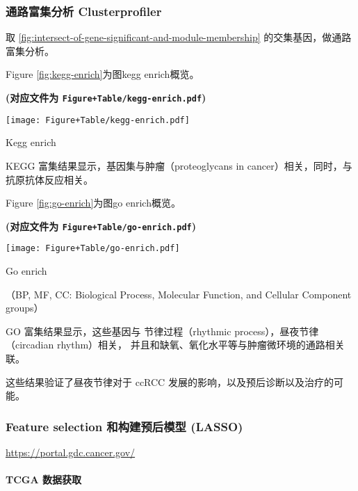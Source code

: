 \documentclass[
]{article}
\begin{document}
\hypertarget{ux901aux8defux5bccux96c6ux5206ux6790-clusterprofiler}{%
\subsubsection{通路富集分析 Clusterprofiler}\label{ux901aux8defux5bccux96c6ux5206ux6790-clusterprofiler}}

取 \ref{fig:intersect-of-gene-significant-and-module-membership} 的交集基因，做通路富集分析。

Figure \ref{fig:kegg-enrich}为图kegg enrich概览。

\textbf{(对应文件为 \texttt{Figure+Table/kegg-enrich.pdf})}

\def\@captype{figure}
\begin{center}
\texttt{[image: Figure+Table/kegg-enrich.pdf]}
\caption{Kegg enrich}\label{fig:kegg-enrich}
\end{center}

KEGG 富集结果显示，基因集与肿瘤（proteoglycans in cancer）相关，同时，与抗原抗体反应相关。

Figure \ref{fig:go-enrich}为图go enrich概览。

\textbf{(对应文件为 \texttt{Figure+Table/go-enrich.pdf})}

\def\@captype{figure}
\begin{center}
\texttt{[image: Figure+Table/go-enrich.pdf]}
\caption{Go enrich}\label{fig:go-enrich}
\end{center}

（BP, MF, CC: Biological Process, Molecular Function, and Cellular Component groups）

GO 富集结果显示，这些基因与 节律过程（rhythmic process），昼夜节律（circadian rhythm）相关，
并且和缺氧、氧化水平等与肿瘤微环境的通路相关联。

这些结果验证了昼夜节律对于 ccRCC 发展的影响，以及预后诊断以及治疗的可能。

\hypertarget{feature-selection-ux548cux6784ux5efaux9884ux540eux6a21ux578b-lasso}{%
\subsubsection{Feature selection 和构建预后模型 (LASSO)}\label{feature-selection-ux548cux6784ux5efaux9884ux540eux6a21ux578b-lasso}}

\url{https://portal.gdc.cancer.gov/}

\hypertarget{tcga-ux6570ux636eux83b7ux53d6}{%
\paragraph{TCGA 数据获取}\label{tcga-ux6570ux636eux83b7ux53d6}}
\end{document}
